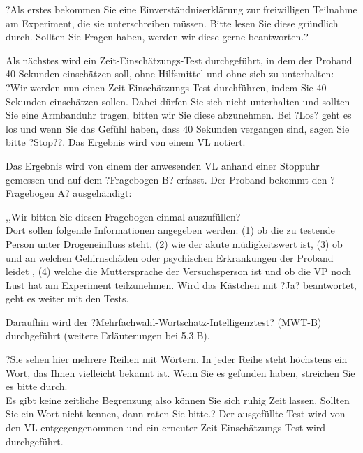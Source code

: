 \documentclass{Bericht}
\begin{document}
?Als erstes bekommen Sie eine Einverständniserklärung
 zur freiwilligen Teilnahme am Experiment, die sie unterschreiben müssen. Bitte lesen Sie diese gründlich durch. Sollten Sie Fragen haben, werden wir diese gerne beantworten.?

\par

Als nächstes wird ein Zeit-Einschätzungs-Test durchgeführt, in dem der Proband 40 Sekunden einschätzen soll, ohne Hilfsmittel und ohne sich zu unterhalten: \\

?Wir werden nun einen Zeit-Einschätzungs-Test durchführen, indem Sie 40 Sekunden einschätzen sollen. Dabei dürfen Sie sich nicht unterhalten und sollten Sie eine Armbanduhr tragen, bitten wir Sie diese abzunehmen. Bei ?Los? geht es los und wenn Sie das Gefühl haben, dass 40 Sekunden vergangen sind, sagen Sie bitte ?Stop??. Das Ergebnis wird von einem VL notiert.

\par

Das Ergebnis wird von einem der anwesenden VL anhand einer Stoppuhr gemessen und auf dem ?Fragebogen B? erfasst. Der Proband bekommt den ?Fragebogen A? ausgehändigt:

,,Wir bitten Sie diesen Fragebogen einmal auszufüllen? \\

Dort sollen folgende Informationen angegeben werden: (1) ob die zu testende Person unter Drogeneinfluss steht, (2) wie der akute müdigkeitswert ist, (3) ob und an welchen Gehirnschäden oder psychischen Erkrankungen der Proband leidet , (4) welche die Muttersprache der Versuchsperson ist und ob die VP noch Lust hat am Experiment teilzunehmen. Wird das Kästchen mit ?Ja? beantwortet, geht es weiter mit den Tests.

\par

Daraufhin wird der ?Mehrfachwahl-Wortschatz-Intelligenztest? (MWT-B) durchgeführt (weitere Erläuterungen bei 5.3.B). 

\par

?Sie sehen hier mehrere Reihen mit Wörtern. In jeder Reihe steht höchstens ein Wort, das Ihnen vielleicht bekannt ist. Wenn Sie es gefunden haben, streichen Sie es bitte durch. \\

Es  gibt keine zeitliche Begrenzung also können Sie sich ruhig Zeit lassen. Sollten Sie ein Wort nicht kennen, dann raten Sie bitte.? Der ausgefüllte Test wird von den VL entgegengenommen und ein erneuter Zeit-Einschätzungs-Test wird durchgeführt. 
\end{document}
